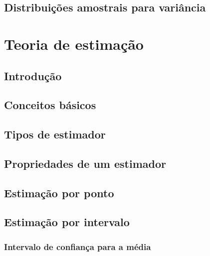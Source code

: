 \documentclass[
]{book}
\begin{document}
\hypertarget{distribuiuxe7uxf5es-amostrais-para-variuxe2ncia}{%
\section{Distribuições amostrais para variância}\label{distribuiuxe7uxf5es-amostrais-para-variuxe2ncia}}

\hypertarget{chap:teoest}{%
\chapter{Teoria de estimação}\label{chap:teoest}}

\hypertarget{introduuxe7uxe3o-6}{%
\section{Introdução}\label{introduuxe7uxe3o-6}}

\hypertarget{conceitos-buxe1sicos-1}{%
\section{Conceitos básicos}\label{conceitos-buxe1sicos-1}}

\hypertarget{tipos-de-estimador}{%
\section{Tipos de estimador}\label{tipos-de-estimador}}

\hypertarget{propriedades-de-um-estimador}{%
\section{Propriedades de um estimador}\label{propriedades-de-um-estimador}}

\hypertarget{estimauxe7uxe3o-por-ponto}{%
\section{Estimação por ponto}\label{estimauxe7uxe3o-por-ponto}}

\hypertarget{estimauxe7uxe3o-por-intervalo}{%
\section{Estimação por intervalo}\label{estimauxe7uxe3o-por-intervalo}}

\hypertarget{intervalo-de-confianuxe7a-para-a-muxe9dia}{%
\subsection{Intervalo de confiança para a média}\label{intervalo-de-confianuxe7a-para-a-muxe9dia}}
\end{document}
